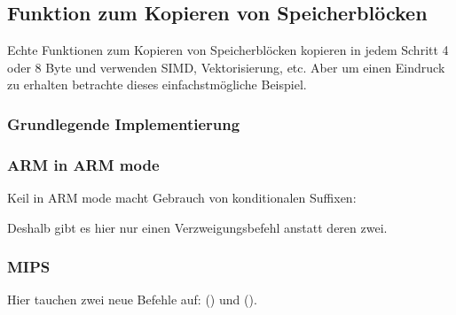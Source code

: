 \subsection{Funktion zum Kopieren von Speicherblöcken}
\label{loop_memcpy}

Echte Funktionen zum Kopieren von Speicherblöcken kopieren in jedem Schritt 4
oder 8 Byte und verwenden \ac{SIMD}, Vektorisierung, etc.
Aber um einen Eindruck zu erhalten betrachte dieses einfachstmögliche Beispiel.



\subsubsection{Grundlegende Implementierung}







\subsubsection{ARM in ARM mode}

Keil in ARM mode macht Gebrauch von konditionalen Suffixen:



Deshalb gibt es hier nur einen Verzweigungsbefehl anstatt deren zwei.

\subsubsection{MIPS}




Hier tauchen zwei neue Befehle auf:  () und
 ().

